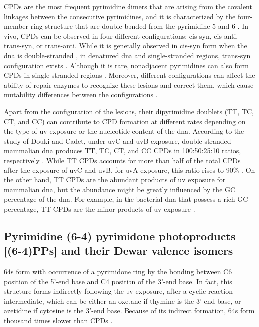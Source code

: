 \gls{CPD}s are the most frequent pyrimidine dimers that are arising from the covalent linkages between the consecutive pyrimidines, and it is characterized by the four-member ring structure that are double bonded from the pyrimidine 5 and 6 \citep{whitmore2001effect}. In vivo, \gls{CPD}s can be observed in four different configurations: cis-syn, cis-anti, trans-syn, or trans-anti. \citep{khattak1972photochemical} While it is generally observed in cis-syn form when the \gls{dna} is double-stranded \citep{wacker1964organic}, in denatured \gls{dna} and single-stranded regions, trans-syn configuration exists \citep{taylor1988synthesis}. Although it is rare, nonadjacent pyrimidines can also form \gls{CPD}s in single-stranded regions \citep{nguyen1988ultraviolet}. Moreover, different configurations can affect the ability of repair enzymes to recognize these lesions and correct them, which cause mutability differences between the configurations \citep{friedberg2005dna}. 

Apart from the configuration of the lesions, their dipyrimidine doublets (\gls{T}\gls{T}, \gls{T}\gls{C}, \gls{C}\gls{T}, and \gls{C}\gls{C}) can contribute to \gls{CPD} formation at different rates depending on the type of \gls{uv} exposure or the nucleotide content of the \gls{dna}. According to the study of Douki and Cadet, under \gls{uv}C and \gls{uv}B exposure, double-stranded mammalian \gls{dna} produces \gls{T}\gls{T}, \gls{T}\gls{C}, \gls{C}\gls{T}, and \gls{C}\gls{C} \gls{CPD}s in 100:50:25:10 ratios, respectively \citep{douki2001individual}. While \gls{T}\gls{T} \gls{CPD}s accounts for more than half of the total \gls{CPD}s after the exposure of \gls{uv}C and \gls{uv}B, for \gls{uv}A exposure, this ratio rises to 90\% \citep{mouret2010uva}. On the other hand, \gls{T}\gls{T} \gls{CPD}s are the abundant products of \gls{uv} exposure for mammalian \gls{dna}, but the abundance might be greatly influenced by the \gls{G}\gls{C} percentage of the \gls{dna}. For example, in the bacterial \gls{dna} that possess a rich \gls{G}\gls{C} percentage, \gls{T}\gls{T} \gls{CPD}s are the minor products of \gls{uv} exposure \citep{patrick1977studies}.

\subsection{Pyrimidine (6-4) pyrimidone photoproducts [(6-4)PPs] and their Dewar valence isomers}

\gls{64}s form with occurrence of a pyrimidone ring by the bonding between C6 position of the 5’-end base and C4 position of the 3’-end base. In fact, this structure forms indirectly following the \gls{uv} exposure, after a cyclic reaction intermediate, which can be either an oxetane if thymine is the 3’-end base, or azetidine if cytosine is the 3’-end base. Because of its indirect formation, \gls{64}s form thousand times slower than \gls{CPD}s \citep{schreier2007thymine}. 

